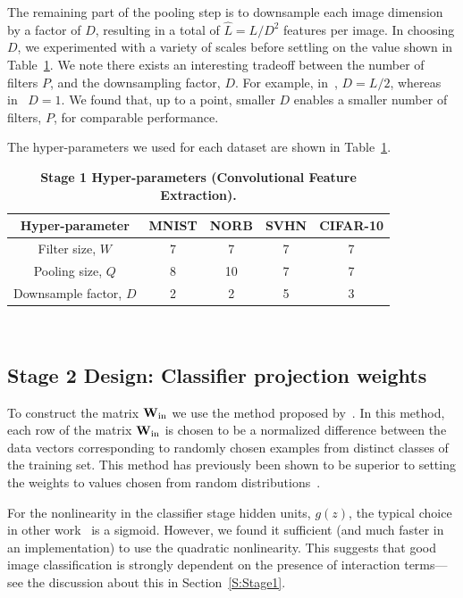 \documentclass[conference]{IEEEtran}
\begin{document}
The remaining part of the pooling step is to downsample each image dimension by a factor of $D$, resulting in a total of $\hat{L} = L/D^2$ features per image. In choosing $D$, we experimented with a variety of scales before settling on the value  shown in Table~\ref{Table2}. We note there exists an interesting tradeoff between the number of filters $P$, and the downsampling factor, $D$. For example, in~\cite{Coates.11}, $D=L/2$, whereas in~\cite{Le.10} $D=1$.  We found that, up to a point, smaller $D$ enables a smaller number of filters, $P$, for comparable performance.

The hyper-parameters we used for each dataset are shown in Table~\ref{Table2}.

\begin{table}[!ht]
{\footnotesize
\begin{tabular}{|c|c|c|c|c|}
\hline
Hyper-parameter & MNIST & NORB & SVHN & CIFAR-10\\
\hline
Filter size, $W$ & 7 & 7 & 7 & 7\\
Pooling size, $Q$ & 8 & 10 & 7 & 7\\
Downsample factor,  $D$ & 2 & 2 & 5 & 3\\
\hline
\end{tabular}
~\\
\caption{\bf{Stage 1 Hyper-parameters (Convolutional Feature Extraction).  }}\label{Table2}
}
\end{table}%


\subsection{Stage 2 Design: Classifier projection weights}

To construct the  matrix ${\bf W}_{\rm in}$ we use the method proposed by~\cite{Zhu.14}. In this method, each row of the matrix ${\bf W}_{\rm in}$ is chosen to be a normalized difference between the data vectors corresponding to randomly chosen examples from distinct classes of the training set. This method has previously been shown to be superior to setting the weights to values chosen from random distributions~\cite{Zhu.14,McDonnell.15PLOS}.

For the nonlinearity in the classifier stage hidden units, $g(z)$, the typical choice in other work~\cite{Huang.14}  is  a sigmoid. However, we found it sufficient (and much faster in an implementation) to use the quadratic nonlinearity. This suggests that good image classification is strongly dependent on  the presence of interaction terms---see the discussion about this in Section~\ref{S:Stage1}.
\end{document}

